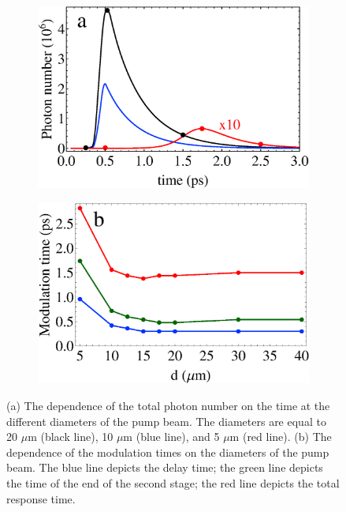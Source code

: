 \documentclass[aps,prapplied,amsmath,amssymb,onecolumn,superscriptaddress,showpacs,floatfix,longbibliography]{revtex4-1}
\begin{document}
\begin{figure}[h]
	\centering
	\begin{subfigure}[h]{0.45\linewidth}
		\includegraphics[width=\linewidth]{Fig2a.eps}
	\end{subfigure}
	\begin{subfigure}[h]{0.45\linewidth}
		\includegraphics[width=\linewidth]{Fig2b.eps}
	\end{subfigure}
	\caption{(a) The dependence of the total photon number on the time at the different diameters of the pump beam. The diameters are equal to 20 $\mu$m (black line), 10 $\mu$m (blue line), and 5 $\mu$m (red line). (b) The dependence of the modulation times on the diameters of the pump beam. The blue line depicts the delay time; the green line depicts the time of the end of the second stage; the red line depicts the total response time.}
	\label{fig2}
\end{figure}
\end{document}
